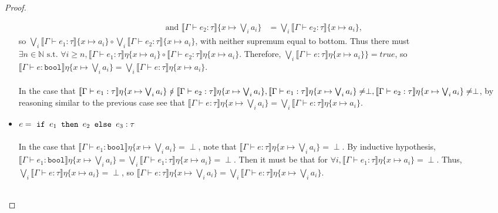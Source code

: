 \begin{proof}
\begin{itemize}
\begin{align*}
 \text{and } \llbracket \Gamma \vdash e_2 : \tau \rrbracket\{x\mapsto  \bigvee_i a_i\} &= \bigvee_i\llbracket \Gamma \vdash e_2 : \tau \rrbracket\{x\mapsto a_i\}, 
  \end{align*}
  so $\bigvee_i\llbracket \Gamma \vdash e_1 : \tau \rrbracket\{x\mapsto a_i\} 
  \circ \bigvee_i\llbracket \Gamma \vdash e_2 : \tau \rrbracket\{x\mapsto a_i\}$, with neither supremum equal to bottom. Thus there must $\exists n \in \mathbb{N} \text{ s.t. } \forall i \geq n, \llbracket \Gamma \vdash e_1 : \tau \rrbracket\eta\{x\mapsto   a_i\} \circ
  \llbracket \Gamma \vdash e_2 : \tau \rrbracket\eta\{x\mapsto   a_i\}$. Therefore, $\bigvee_i\llbracket \Gamma \vdash e : \tau \rrbracket\eta\{x\mapsto  a_i\}\} = true$, so $\llbracket \Gamma \vdash e : \texttt{bool}\rrbracket\eta\{x\mapsto \bigvee_i a_i\} 
  = \bigvee_i\llbracket \Gamma \vdash e : \tau \rrbracket\eta\{x\mapsto  a_i\}$. \\ \\
 In the case that $\llbracket \Gamma \vdash e_1 : \tau \rrbracket\eta\{x\mapsto  \bigvee_i a_i\} \ \slashed{\circ} \ \llbracket \Gamma \vdash e_2 : \tau\rrbracket\eta\{x\mapsto  \bigvee_i a_i\}, \ \\
 \llbracket \Gamma \vdash e_1 : \tau \rrbracket\eta\{x\mapsto  \bigvee_i a_i\} \neq \perp, 
 \llbracket \Gamma \vdash e_2 : \tau \rrbracket\eta\{x\mapsto  \bigvee_i a_i\} \neq \perp$, by reasoning similar to the previous case see that $\llbracket \Gamma \vdash e : \tau \rrbracket\eta\{x\mapsto  \bigvee_i a_i\} = 
 \bigvee_i\llbracket \Gamma \vdash e : \tau \rrbracket\eta\{x\mapsto  a_i\}$.
 \item $e = \ \texttt{if } e_1 \texttt{ then } e_2 \texttt{ else } e_3 : \tau$ \\ \\
In the case that $\llbracket \Gamma \vdash e_1 : \texttt{bool} \rrbracket\eta\{x\mapsto  \bigvee_i a_i\} = \perp$, note that $\llbracket \Gamma \vdash e : 
\tau \rrbracket\eta\{x\mapsto  \bigvee_i a_i\} =  \perp$. By inductive hypothesis, 
$\llbracket \Gamma \vdash e_1 : \texttt{bool} \rrbracket\eta\{x\mapsto  \bigvee_i a_i\} = 
\bigvee_i\llbracket \Gamma \vdash e_1 : \tau \rrbracket\eta\{x\mapsto a_i\} = \perp$. 
Then it must be that for 
$\forall i, \llbracket \Gamma \vdash e_1 : \tau \rrbracket\eta\{x\mapsto a_i\} = \perp$. 
Thus, $\bigvee_i\llbracket \Gamma \vdash e : \tau \rrbracket\eta\{x\mapsto  a_i\} = \perp$, so 
$\llbracket \Gamma \vdash e : \tau \rrbracket\eta\{x\mapsto  \bigvee_i a_i\} = 
\bigvee_i\llbracket \Gamma \vdash e : \tau \rrbracket\eta\{x\mapsto  \bigvee_i a_i\}$. \\ \\

\end{itemize}
\end{proof}
